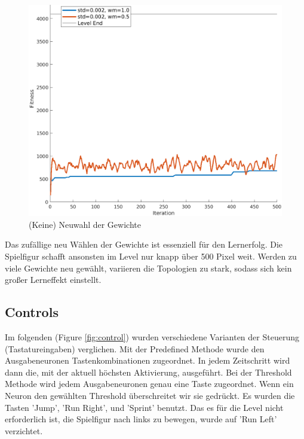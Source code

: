 \documentclass{hbrs-ecta-report}
\begin{document}
\begin{figure}[h!]
	\centering
	\includegraphics[width=\linewidth]{img/learningRates2.png}
	\caption{(Keine) Neuwahl der Gewichte}
	\label{fig:learningRates2} 
\end{figure}

Das zufällige neu Wählen der Gewichte ist essenziell für den Lernerfolg. Die Spielfigur schafft ansonsten im Level nur knapp über 500 Pixel weit. Werden zu viele Gewichte neu gewählt, variieren die Topologien zu stark, sodass sich kein großer Lerneffekt einstellt.

\subsection{Controls}
Im folgenden (Figure \ref{fig:control}) wurden verschiedene Varianten der Steuerung (Tastatureingaben) verglichen.
Mit der Predefined Methode wurde den Ausgabeneuronen Tastenkombinationen zugeordnet. In jedem Zeitschritt wird dann die, mit der aktuell höchsten Aktivierung, ausgeführt.
Bei der Threshold Methode wird jedem Ausgabeneuronen genau eine Taste zugeordnet. Wenn ein Neuron den gewählten Threshold überschreitet wir sie gedrückt. \newline
Es wurden die Tasten 'Jump', 'Run Right', und 'Sprint' benutzt. Das es für die Level nicht erforderlich ist, die Spielfigur nach links zu bewegen, wurde auf 'Run Left' verzichtet. \newline
\end{document}
